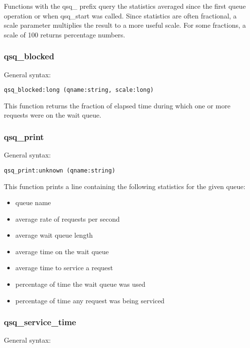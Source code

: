 \documentclass[twoside,english]{article}
\newenvironment{vindent}
{\begin{list}{}{\setlength{\listparindent}{6pt}}
\item[]}
{\end{list}}
\begin{document}
Functions with the qsq\_ prefix query the statistics averaged since the first
queue operation or when qsq\_start was called. Since statistics are often
fractional, a scale parameter multiplies the result to a more useful scale.
For some fractions, a scale of 100 returns percentage numbers.


\subsubsection{qsq\_blocked}
General syntax:

\begin{vindent}
\begin{verbatim}
qsq_blocked:long (qname:string, scale:long)
\end{verbatim}
\end{vindent}
This function returns the fraction of elapsed time during which one or more
requests were on the wait queue.


\subsubsection{qsq\_print}
General syntax:

\begin{vindent}
\begin{verbatim}
qsq_print:unknown (qname:string)
\end{verbatim}
\end{vindent}
This function prints a line containing the following statistics for the given
queue: 

\begin{itemize}
\item queue name
\item average rate of requests per second
\item average wait queue length
\item average time on the wait queue
\item average time to service a request
\item percentage of time the wait queue was used
\item percentage of time any request was being serviced
\end{itemize}

\subsubsection{qsq\_service\_time}
General syntax:
\end{document}
